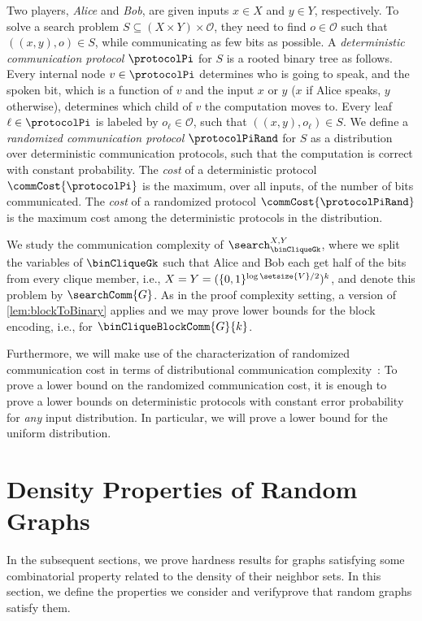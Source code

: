 Two players, \emph{Alice} and \emph{Bob}, 
are given inputs $x\in X$ and $y\in Y$, respectively. 
To solve a search problem $S\subseteq (X \times Y) \times \mathcal{O}$, they need to find $o\in \mathcal{O}$ such that $((x,y),o)\in S$, 
while communicating as few bits as possible. 
A \emph{deterministic communication protocol} $\protocolPi$ for $S$ is a rooted binary tree as follows. Every internal node $v\in\protocolPi$ determines who is going to speak, and the spoken bit, which is a function of $v$ and the input $x$ or $y$ ($x$ if Alice speaks, $y$ otherwise), determines which child of $v$ the computation moves to. Every leaf $\ell \in \protocolPi$ is labeled by $o_{\ell} \in \mathcal{O}$, such that $((x,y),o_{\ell})\in S$.
We define a \emph{randomized communication protocol} $\protocolPiRand$ for $S$ as a distribution over deterministic communication protocols, such that the computation is correct with constant probability.
The \emph{cost} of a deterministic protocol $\commCost{\protocolPi}$ is the maximum, over all inputs, of the number of bits communicated. 
The \emph{cost} of a randomized protocol $\commCost{\protocolPiRand}$ is the maximum cost among the deterministic protocols in the distribution.

We study the communication complexity of $\search^{X,Y}_{\binCliqueGk}$, where we split the variables of $\binCliqueGk$ such that Alice and Bob each get half of the bits from every clique member, i.e., $X=Y=(\{0,1\}^{\log \setsize{V}/2})^k$, and denote this problem by $\searchComm{G}$. 
As in the proof complexity setting, a version of \autoref{lem:blockToBinary} applies and we may prove lower bounds for the block encoding, i.e., for $\binCliqueBlockComm{G}{k}$. 

Furthermore, we will make use of the characterization of randomized communication cost in terms of distributional communication complexity~\cite{yao83}: To prove a lower bound on the randomized communication cost, it is enough to prove a lower bounds on deterministic protocols with constant error probability for \emph{any} input distribution. 
In particular, we will prove a lower bound for the uniform distribution.
\section{Density Properties of Random Graphs}
\label{sec:density-properties}

In the subsequent sections, we prove hardness results for graphs satisfying some combinatorial property related to the density of their neighbor sets.  
In this section, we define the properties we consider and 
{verify}{prove} that random graphs satisfy them. 


